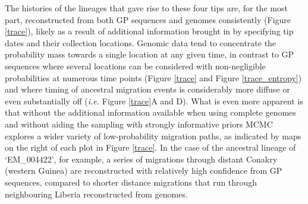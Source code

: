 \documentclass{bmcart}
\begin{document}
The histories of the lineages that gave rise to these four tips are, for the most part, reconstructed from both GP sequences and genomes consistently (Figure \ref{trace}), likely as a result of additional information brought in by specifying tip dates and their collection locations.
Genomic data tend to concentrate the probability mass towards a single location at any given time, in contrast to GP sequences where several locations can be considered with non-negligible probabilities at numerous time points (Figure \ref{trace} and Figure \ref{trace_entropy}) and where timing of ancestral migration events is considerably more diffuse or even substantially off (\textit{i.e.} Figure \ref{trace}A and D).
What is even more apparent is that without the additional information available when using complete genomes and without aiding the sampling with strongly informative priors MCMC explores a wider variety of low-probability migration paths, as indicated by maps on the right of each plot in Figure \ref{trace}.
In the case of the ancestral lineage of `EM\_004422', for example, a series of migrations through distant Conakry (western Guinea) are reconstructed with relatively high confidence from GP sequences, compared to shorter distance migrations that run through neighbouring Liberia reconstructed from genomes.
\end{document}
